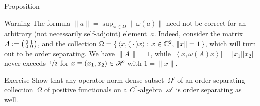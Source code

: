 \documentclass[a]{subfiles}
\begin{document}
\begin{parsec}
\begin{point}{Proposition}
\begin{point}{Warning}
The formula
$\|a\|=\sup_{\omega\in\Omega} \|\omega(a)\|$
need not be correct
for an arbitrary (not necessarily self-adjoint)
element~$a$.
Indeed,
consider the matrix $A:=\smash{%
\bigl(\begin{smallmatrix}0&1\\0&0\end{smallmatrix}\bigr)}$,
and the collection $\Omega=\{\,\left<x,(\,\cdot\,)x\right>\colon 
x\in \mathbb{C}^2,\,\|x\|=1\,\}$,
which will turn out to be order separating.
We have $\|A\|=1$,
while $\left| \left<x,\omega(A)x\right>\right|
 =\left|x_1\right|\left|x_2\right|$
 never exceeds~$\nicefrac{1}{2}$
for $x\equiv (x_1,x_2)\in \mathscr{H}$ with $1=\|x\|$.
\end{point}
\end{point}
\begin{point}{Exercise}%
Show that any operator norm dense subset~$\Omega'$
of an order separating collection~$\Omega$
of positive functionals
on a $C^*$-algebra~$\mathscr{A}$
is order separating as well.
\end{point}
\end{parsec}
\end{document}
